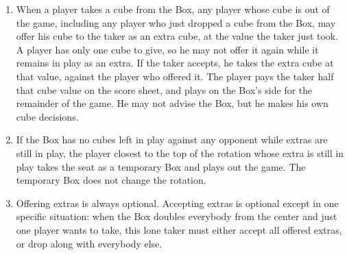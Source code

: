 \documentclass[11pt]{article}
\begin{document}
\begin{enumerate}
\item When a player takes a cube from the Box, any player whose cube
  is out of the game, including any player who just dropped a cube
  from the Box, may offer his cube to the taker as an extra cube, at
  the value the taker just took.  A player has only one cube to give,
  so he may not offer it again while it remains in play as an extra.
  If the taker accepts, he takes the extra cube at that value, against
  the player who offered it.  The player pays the taker half that cube
  value on the score sheet, and plays on the Box's side for the
  remainder of the game.  He may not advise the Box, but he makes his
  own cube decisions.

\item If the Box has no cubes left in play against any opponent while
  extras are still in play, the player closest to the top of the
  rotation whose extra is still in play takes the seat as a temporary
  Box and plays out the game.  The temporary Box does not change the
  rotation.

\item Offering extras is always optional.  Accepting extras is
  optional except in one specific situation: when the Box doubles
  everybody from the center and just one player wants to take, this
  lone taker must either accept all offered extras, or drop along with
  everybody else.
\end{enumerate}
\end{document}
